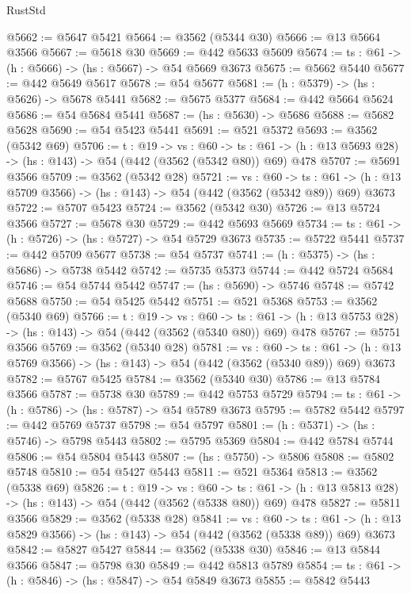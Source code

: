 \begin{lexlean}{RustStd}
\begin{coremodule}
@5662 := @5647 @5421
@5664 := @3562 (@5344 @30)
@5666 := @13 @5664 @3566
@5667 := @5618 @30
@5669 := @442 @5633 @5609
@5674 := {ts : @61} -> (h : @5666) -> (hs : @5667) -> @54 @5669 @3673
@5675 := @5662 @5440
@5677 := @442 @5649 @5617
@5678 := @54 @5677
@5681 := (h : @5379) -> (hs : @5626) -> @5678 @5441
@5682 := @5675 @5377
@5684 := @442 @5664 @5624
@5686 := @54 @5684 @5441
@5687 := (hs : @5630) -> @5686
@5688 := @5682 @5628
@5690 := @54 @5423 @5441
@5691 := @521 @5372
@5693 := @3562 (@5342 @69)
@5706 := {t : @19} ->
  {vs : @60} ->
  {ts : @61} -> (h : @13 @5693 @28) -> (hs : @143) -> @54 (@442 (@3562 (@5342 @80)) @69) @478
@5707 := @5691 @3566
@5709 := @3562 (@5342 @28)
@5721 := {vs : @60} ->
  {ts : @61} -> (h : @13 @5709 @3566) -> (hs : @143) -> @54 (@442 (@3562 (@5342 @89)) @69) @3673
@5722 := @5707 @5423
@5724 := @3562 (@5342 @30)
@5726 := @13 @5724 @3566
@5727 := @5678 @30
@5729 := @442 @5693 @5669
@5734 := {ts : @61} -> (h : @5726) -> (hs : @5727) -> @54 @5729 @3673
@5735 := @5722 @5441
@5737 := @442 @5709 @5677
@5738 := @54 @5737
@5741 := (h : @5375) -> (hs : @5686) -> @5738 @5442
@5742 := @5735 @5373
@5744 := @442 @5724 @5684
@5746 := @54 @5744 @5442
@5747 := (hs : @5690) -> @5746
@5748 := @5742 @5688
@5750 := @54 @5425 @5442
@5751 := @521 @5368
@5753 := @3562 (@5340 @69)
@5766 := {t : @19} ->
  {vs : @60} ->
  {ts : @61} -> (h : @13 @5753 @28) -> (hs : @143) -> @54 (@442 (@3562 (@5340 @80)) @69) @478
@5767 := @5751 @3566
@5769 := @3562 (@5340 @28)
@5781 := {vs : @60} ->
  {ts : @61} -> (h : @13 @5769 @3566) -> (hs : @143) -> @54 (@442 (@3562 (@5340 @89)) @69) @3673
@5782 := @5767 @5425
@5784 := @3562 (@5340 @30)
@5786 := @13 @5784 @3566
@5787 := @5738 @30
@5789 := @442 @5753 @5729
@5794 := {ts : @61} -> (h : @5786) -> (hs : @5787) -> @54 @5789 @3673
@5795 := @5782 @5442
@5797 := @442 @5769 @5737
@5798 := @54 @5797
@5801 := (h : @5371) -> (hs : @5746) -> @5798 @5443
@5802 := @5795 @5369
@5804 := @442 @5784 @5744
@5806 := @54 @5804 @5443
@5807 := (hs : @5750) -> @5806
@5808 := @5802 @5748
@5810 := @54 @5427 @5443
@5811 := @521 @5364
@5813 := @3562 (@5338 @69)
@5826 := {t : @19} ->
  {vs : @60} ->
  {ts : @61} -> (h : @13 @5813 @28) -> (hs : @143) -> @54 (@442 (@3562 (@5338 @80)) @69) @478
@5827 := @5811 @3566
@5829 := @3562 (@5338 @28)
@5841 := {vs : @60} ->
  {ts : @61} -> (h : @13 @5829 @3566) -> (hs : @143) -> @54 (@442 (@3562 (@5338 @89)) @69) @3673
@5842 := @5827 @5427
@5844 := @3562 (@5338 @30)
@5846 := @13 @5844 @3566
@5847 := @5798 @30
@5849 := @442 @5813 @5789
@5854 := {ts : @61} -> (h : @5846) -> (hs : @5847) -> @54 @5849 @3673
@5855 := @5842 @5443

\end{coremodule}
\end{lexlean}
